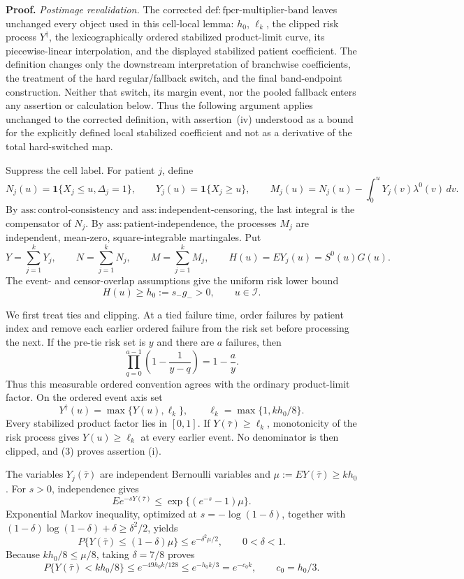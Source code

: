 \textbf{Proof.}
\emph{Postimage revalidation.}
The corrected \(\mathrm{def:fpcr\mbox{-}multiplier\mbox{-}band}\) leaves unchanged every object used in this cell-local lemma: \(h_0\), \(\ell_k\), the clipped risk process \(Y^\dagger\), the lexicographically ordered stabilized product-limit curve, its piecewise-linear interpolation, and the displayed stabilized patient coefficient. The definition changes only the downstream interpretation of branchwise coefficients, the treatment of the hard regular/fallback switch, and the final band-endpoint construction. Neither that switch, its margin event, nor the pooled fallback enters any assertion or calculation below. Thus the following argument applies unchanged to the corrected definition, with assertion~(iv) understood as a bound for the explicitly defined local stabilized coefficient and not as a derivative of the total hard-switched map.

Suppress the cell label.  For patient \(j\), define
\[
 N_j(u)=\mathbf 1\{X_j\leq u,\Delta_j=1\},\qquad
 Y_j(u)=\mathbf 1\{X_j\geq u\},\qquad
 M_j(u)=N_j(u)-\int_0^uY_j(v)\lambda^0(v)\,dv.             \tag{1}
\]
By \(\mathrm{ass:control\mbox{-}consistency}\) and
\(\mathrm{ass:independent\mbox{-}censoring}\), the last integral is the
compensator of \(N_j\).  By
\(\mathrm{ass:patient\mbox{-}independence}\), the processes \(M_j\) are
independent, mean-zero, square-integrable martingales.  Put
\[
 Y=\sum_{j=1}^kY_j,\qquad N=\sum_{j=1}^kN_j,
 \qquad M=\sum_{j=1}^kM_j,
 \qquad H(u)=E Y_j(u)=S^0(u)G(u).
\]
The event- and censor-overlap assumptions give the uniform risk lower bound
\[
 H(u)\geq h_0:=s_-g_->0,
 \qquad u\in\mathcal I.                                  \tag{2}
\]

We first treat ties and clipping.  At a tied failure time, order failures by
patient index and remove each earlier ordered failure from the risk set before
processing the next.  If the pre-tie risk set is \(y\) and there are \(a\)
failures, then
\[
 \prod_{q=0}^{a-1}\left(1-\frac{1}{y-q}\right)=1-\frac{a}{y}. \tag{3}
\]
Thus this measurable ordered convention agrees with the ordinary
product-limit factor.  On the ordered event axis set
\[
 Y^\dagger(u)=\max\{Y(u),\ell_k\},
 \qquad \ell_k=\max\{1,kh_0/8\}.
\]
Every stabilized product factor lies in \([0,1]\).  If
\(Y(\bar\tau)\geq\ell_k\), monotonicity of the risk process gives
\(Y(u)\geq\ell_k\) at every earlier event.  No denominator is then clipped,
and (3) proves assertion (i).

The variables \(Y_j(\bar\tau)\) are independent Bernoulli variables and
\(\mu:=E Y(\bar\tau)\geq kh_0\).  For \(s>0\), independence gives
\[
 E e^{-sY(\bar\tau)}
 \leq \exp\{(e^{-s}-1)\mu\}.
\]
Exponential Markov inequality, optimized at
\(s=-\log(1-\delta)\), together with
\((1-\delta)\log(1-\delta)+\delta\geq\delta^2/2\), yields
\[
 P\{Y(\bar\tau)\leq(1-\delta)\mu\}
 \leq e^{-\delta^2\mu/2},
 \qquad 0<\delta<1.                                      \tag{4}
\]
Because \(kh_0/8\leq\mu/8\), taking \(\delta=7/8\) proves
\[
 P\{Y(\bar\tau)<kh_0/8\}
 \leq e^{-49h_0k/128}
 \leq e^{-h_0k/3}=e^{-c_0k},
 \qquad c_0=h_0/3.                                       \tag{5}
\]

